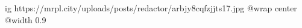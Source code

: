  
 
 
 
 

\ifcmt
  ig https://mrpl.city/uploads/posts/redactor/arbjy8cqfzjjts17.jpg
  @wrap center
  @width 0.9
\fi
